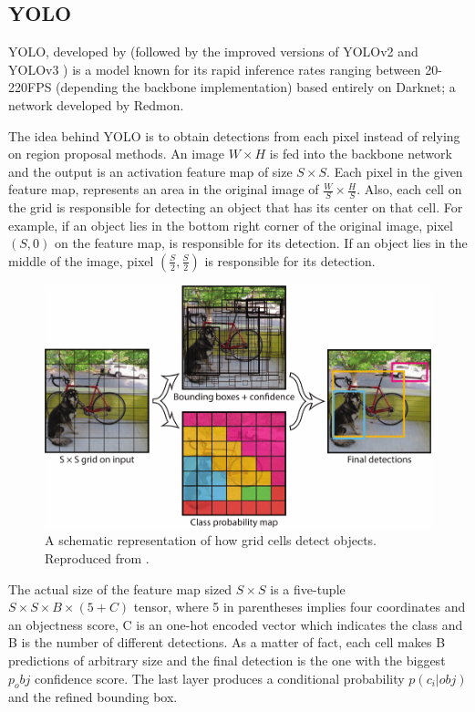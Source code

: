  \subsection{YOLO}
 YOLO, developed by \cite{redmon2016you} (followed by the improved versions of YOLOv2 \cite{redmon2017yolo9000} and YOLOv3 \cite{redmon2018yolov3}) is a model known for its rapid inference 
 rates ranging between 20-220FPS (depending the backbone implementation) based entirely on Darknet; a network developed by Redmon.
 
 The idea behind YOLO is to obtain detections from each pixel instead of relying on region proposal methods. An image $W\times H$ is fed into the backbone network and the output is an activation feature map of size $S\times S$. Each pixel in the given feature map, represents an area in the original image of $\frac{W}{S} \times \frac{H}{S}$. Also, each cell on the grid is responsible for detecting an object that has its center on that cell. For example, if an object lies in the bottom right corner of the original image, pixel $(S,0)$ on the feature map, is responsible for its detection. If an object lies in the middle of the image, pixel $(\frac{S}{2},\frac{S}{2})$ is responsible for its detection. 
 
\begin{figure}[!htb]
  \centering
  \includegraphics[width=12cm]{images/ch2/fig5.png}
  \caption{A schematic representation of how grid cells detect objects. Reproduced from \cite{redmon2016you}.}
  \label{fig5}
\end{figure} 
 
The actual size of the feature map sized $S\times S$ is a five-tuple $S\times S \times B\times(5+C)$ tensor, where 5 in parentheses implies four coordinates and an objectness score, C is an one-hot encoded vector which indicates the class and B is the number of different detections. As a matter of fact, each cell makes B predictions of arbitrary size and the final detection is the one with the biggest $p_obj$ confidence score. The last layer produces a conditional probability $p(c_i|obj)$ and the refined bounding box.

